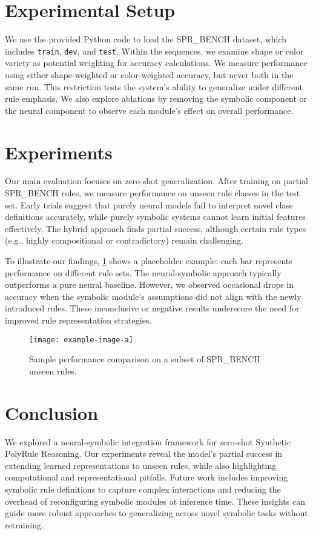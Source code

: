 \documentclass{article} %
\theoremstyle{plain}
\theoremstyle{definition}
\theoremstyle{remark}
\begin{document}
\section{Experimental Setup}\label{sec:experimental_setup}
We use the provided Python code to load the SPR\_BENCH dataset, which includes \texttt{train}, \texttt{dev}, and \texttt{test}. Within the sequences, we examine shape or color variety as potential weighting for accuracy calculations. We measure performance using either shape-weighted or color-weighted accuracy, but never both in the same run. This restriction tests the system's ability to generalize under different rule emphasis. We also explore ablations by removing the symbolic component or the neural component to observe each module's effect on overall performance.

\section{Experiments}\label{sec:experiments}
Our main evaluation focuses on zero-shot generalization. After training on partial SPR\_BENCH rules, we measure performance on unseen rule classes in the test set. Early trials suggest that purely neural models fail to interpret novel class definitions accurately, while purely symbolic systems cannot learn initial features effectively. The hybrid approach finds partial success, although certain rule types (e.g., highly compositional or contradictory) remain challenging.

To illustrate our findings, \cref{fig:first_figure} shows a placeholder example: each bar represents performance on different rule sets. The neural-symbolic approach typically outperforms a pure neural baseline. However, we observed occasional drops in accuracy when the symbolic module's assumptions did not align with the newly introduced rules. These inconclusive or negative results underscore the need for improved rule representation strategies.

\begin{figure}[t]
\centering
\texttt{[image: example-image-a]}
\caption{Sample performance comparison on a subset of SPR\_BENCH unseen rules.}
\label{fig:first_figure}
\end{figure}

\section{Conclusion}\label{sec:conclusion}
We explored a neural-symbolic integration framework for zero-shot Synthetic PolyRule Reasoning. Our experiments reveal the model's partial success in extending learned representations to unseen rules, while also highlighting computational and representational pitfalls. Future work includes improving symbolic rule definitions to capture complex interactions and reducing the overhead of reconfiguring symbolic modules at inference time. These insights can guide more robust approaches to generalizing across novel symbolic tasks without retraining.
\end{document}
